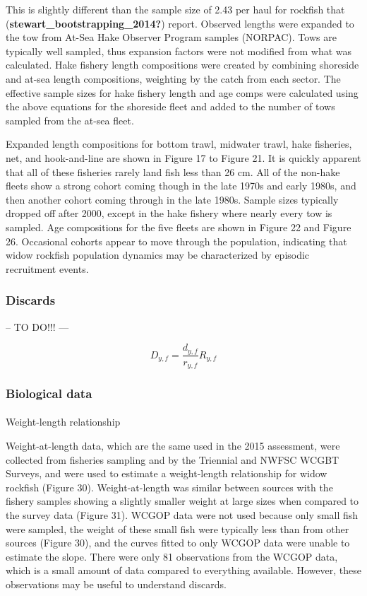 \documentclass[
]{scrartcl}
\makeatletter
\let\oldparagraph\paragraph
\renewcommand{\paragraph}{
    \@ifstar
      \xxxParagraphStar
      \xxxParagraphNoStar
  }
\newcommand{\xxxParagraphStar}[1]{\oldparagraph*{#1}\mbox{}}
\newcommand{\xxxParagraphNoStar}[1]{\oldparagraph{#1}\mbox{}}
\makeatother
\begin{document}
This is slightly different than the sample size of 2.43 per haul for
rockfish that (\textbf{stewart\_bootstrapping\_2014?}) report. Observed
lengths were expanded to the tow from At-Sea Hake Observer Program
samples (NORPAC). Tows are typically well sampled, thus expansion
factors were not modified from what was calculated. Hake fishery length
compositions were created by combining shoreside and at-sea length
compositions, weighting by the catch from each sector. The effective
sample sizes for hake fishery length and age comps were calculated using
the above equations for the shoreside fleet and added to the number of
tows sampled from the at-sea fleet.

Expanded length compositions for bottom trawl, midwater trawl, hake
fisheries, net, and hook-and-line are shown in Figure 17 to Figure 21.
It is quickly apparent that all of these fisheries rarely land fish less
than 26 cm. All of the non-hake fleets show a strong cohort coming
though in the late 1970s and early 1980s, and then another cohort coming
through in the late 1980s. Sample sizes typically dropped off after
2000, except in the hake fishery where nearly every tow is sampled. Age
compositions for the five fleets are shown in Figure 22 and Figure 26.
Occasional cohorts appear to move through the population, indicating
that widow rockfish population dynamics may be characterized by episodic
recruitment events.

\subsubsection{Discards}\label{discards}

-- TO DO!!! ---

\[
D_{y,f} = \frac{d_{y,f}}{r_{y,f}} R_{y,f}
\]

\subsubsection{Biological data}\label{biological-data}

\paragraph{Weight-length relationship}\label{weight-length-relationship}

Weight-at-length data, which are the same used in the 2015 assessment,
were collected from fisheries sampling and by the Triennial and NWFSC
WCGBT Surveys, and were used to estimate a weight-length relationship
for widow rockfish (Figure 30). Weight-at-length was similar between
sources with the fishery samples showing a slightly smaller weight at
large sizes when compared to the survey data (Figure 31). WCGOP data
were not used because only small fish were sampled, the weight of these
small fish were typically less than from other sources (Figure 30), and
the curves fitted to only WCGOP data were unable to estimate the slope.
There were only 81 observations from the WCGOP data, which is a small
amount of data compared to everything available. However, these
observations may be useful to understand discards.
\end{document}
